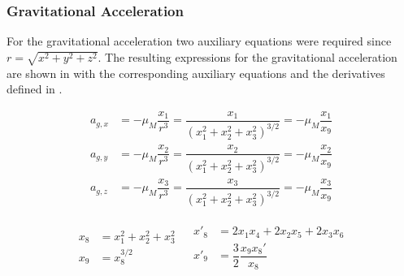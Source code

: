 \subsubsection{Gravitational Acceleration}
 \label{subsubsec:tsiGravity} 
 For the gravitational acceleration two auxiliary equations were required since $r=\sqrt{x^{2}+y^{2}+z^{2}}$. The resulting expressions for the gravitational acceleration are shown in  with the corresponding auxiliary equations and the derivatives defined in .
 
 \begin{equation} \label{eq:gravAcc}
\begin{split}
a_{g,x} &= -\mu_{M}\dfrac{x_{1}}{r^{3}} = \dfrac{x_{1}}{\left(x_{1}^{2}+x_{2}^{2}+x_{3}^{2} \right)^{3/2}}=-\mu_{M}\dfrac{x_{1}}{x_{9}}\\
a_{g,y} &= -\mu_{M}\dfrac{x_{2}}{r^{3}} = \dfrac{x_{2}}{\left(x_{1}^{2}+x_{2}^{2}+x_{3}^{2} \right)^{3/2}}=-\mu_{M}\dfrac{x_{2}}{x_{9}}\\
a_{g,z} &= -\mu_{M}\dfrac{x_{3}}{r^{3}} = \dfrac{x_{3}}{\left(x_{1}^{2}+x_{2}^{2}+x_{3}^{2} \right)^{3/2}}=-\mu_{M}\dfrac{x_{3}}{x_{9}}
\end{split}
\end{equation}

\begin{align} \label{eq:gravAux}
\begin{split} 
x_{8}&=x_{1}^{2}+x_{2}^{2}+x_{3}^{2}\\
x_{9}&=x_{8}^{3/2}
\end{split} 
&
\begin{split}
x'_{8}&=2x_{1}x_{4}+2x_{2}x_{5}+2x_{3}x_{6}\\
x'_{9}&=\dfrac{3}{2}\dfrac{x_{9}x_{8}'}{x_{8}}
\end{split}
\end{align}
 
 
 
